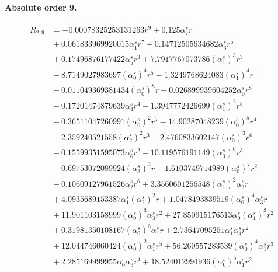 \documentclass[10pt]{article}
\begin{document}
\paragraph{Absolute order 9.}
\begin{align*}
R_{2,9} &=  - 0.00078325253131263 r^{9} + 0.125 \alpha_{7}^s r \\
&{}  + 0.061833969920015 \alpha_{1}^s r^{7} + 0.14712505634682 \alpha_{3}^s r^{5} \\
&{}  + 0.17496876177422 \alpha_{5}^s r^{3} + 7.7917767073786 \left(\alpha_{1}^s\right)^{3} r^{3} \\
&{}  - 8.7149027983697 \left(\alpha_{0}^s\right)^{4} r^{5} - 1.3249768624083 \left(\alpha_{1}^s\right)^{4} r \\
&{}  - 0.011049369381434 \left(\alpha_{0}^s\right)^{8} r - 0.026899939604252 \alpha_{0}^s r^{8} \\
&{}  - 0.17201474879639 \alpha_{4}^s r^{4} - 1.3947772426699 \left(\alpha_{1}^s\right)^{2} r^{5} \\
&{}  - 0.36511047260991 \left(\alpha_{0}^s\right)^{2} r^{7} - 14.90287048239 \left(\alpha_{0}^s\right)^{5} r^{4} \\
&{}  - 2.359240521558 \left(\alpha_{2}^s\right)^{2} r^{3} - 2.4760833602147 \left(\alpha_{0}^s\right)^{3} r^{6} \\
&{}  - 0.15599351595073 \alpha_{6}^s r^{2} - 10.119576191149 \left(\alpha_{0}^s\right)^{6} r^{3} \\
&{}  - 0.69753072089924 \left(\alpha_{3}^s\right)^{2} r - 1.6103749714989 \left(\alpha_{0}^s\right)^{7} r^{2} \\
&{}  - 0.10609127961526 \alpha_{2}^s r^{6} + 3.3560601256548 \left(\alpha_{1}^s\right)^{2} \alpha_{3}^s r \\
&{}  + 4.0935689153387 \alpha_{1}^s \left(\alpha_{2}^s\right)^{2} r + 1.0478493839519 \left(\alpha_{0}^s\right)^{4} \alpha_{3}^s r \\
&{}  + 11.901103158999 \left(\alpha_{0}^s\right)^{3} \alpha_{3}^s r^{2} + 27.850915176513 \alpha_{0}^s \left(\alpha_{1}^s\right)^{3} r^{2} \\
&{}  + 0.31981350108167 \left(\alpha_{0}^s\right)^{6} \alpha_{1}^s r + 2.73647095251 \alpha_{1}^s \alpha_{4}^s r^{2} \\
&{}  + 12.044746060424 \left(\alpha_{0}^s\right)^{2} \alpha_{1}^s r^{5} + 56.260557283539 \left(\alpha_{0}^s\right)^{4} \alpha_{1}^s r^{3} \\
&{}  + 2.285169999955 \alpha_{0}^s \alpha_{3}^s r^{4} + 18.524012994936 \left(\alpha_{0}^s\right)^{5} \alpha_{1}^s r^{2} \\

\end{align*}
\end{document}
